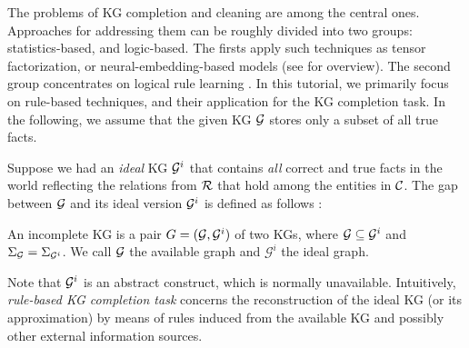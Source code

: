 The problems of KG completion and cleaning are %
among the central ones. Approaches for addressing them can be roughly divided into two groups: statistics-based, and logic-based. The firsts apply such techniques as tensor factorization, or neural-embedding-based models (see \cite{DBLP:journals/pieee/Nickel0TG16} for overview). The second group concentrates on logical rule learning \cite{ruleoverview}. In this tutorial, we primarily focus on rule-based techniques, and their application for the KG completion task. In the following, we assume that the given KG $\mathcal{G}$ stores only a subset of all true facts.

Suppose we had an \emph{ideal} KG $\mathcal{G}^i$ that contains \emph{all} correct and true facts in the world reflecting the relations from $\mathcal{R}$ that hold among the entities in $\mathcal{C}$. The gap between $\mathcal{G}$ and its ideal version $\mathcal{G}^i$ is defined as follows \cite{rdfcomp}: 

\begin{definition} An incomplete KG is a pair
    $G = (\mathcal{G}, \mathcal{G}^i)$ of two KGs, where $\mathcal{G}\subseteq \mathcal{G}^i$ and
    $\Sigma_{\mathcal{G}}=\Sigma_{\mathcal{G}^i}$. We call $\mathcal{G}$ the available
    graph and $\mathcal{G}^i$ the ideal graph.
\end{definition}
    
Note that $\mathcal{G}^i$ is an abstract construct, which is normally unavailable. Intuitively, \emph{rule-based KG completion task} concerns the reconstruction of the ideal KG (or its approximation) by means of rules induced from the available KG and possibly other external information sources.

